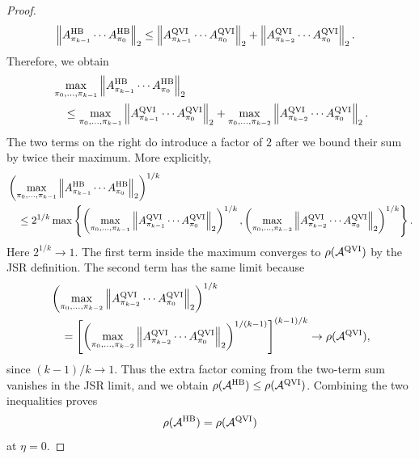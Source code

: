 \documentclass[letterpaper]{article}
\numberwithin{equation}{section}
\begin{document}
\begin{proof}
\begin{align*}
&\left\lVert
    A_{\pi_{k-1}}^{\rm HB}\cdots A_{\pi_0}^{\rm HB}
  \right\rVert_2 \le
  \left\lVert
    A_{\pi_{k-1}}^{\rm QVI}\cdots A_{\pi_0}^{\rm QVI}
  \right\rVert_2
  +
  \left\lVert
    A_{\pi_{k-2}}^{\rm QVI}\cdots A_{\pi_0}^{\rm QVI}
  \right\rVert_2.
\end{align*}
Therefore, we obtain
\begin{align*}
&\max_{\pi_0,\ldots,\pi_{k-1}}
  \left\|A_{\pi_{k-1}}^{\rm HB}\cdots A_{\pi_0}^{\rm HB}\right\|_2 \\
&\quad\le
  \max_{\pi_0,\ldots,\pi_{k-1}}
  \left\|A_{\pi_{k-1}}^{\rm QVI}\cdots A_{\pi_0}^{\rm QVI}\right\|_2
  +
  \max_{\pi_0,\ldots,\pi_{k-2}}
  \left\|A_{\pi_{k-2}}^{\rm QVI}\cdots A_{\pi_0}^{\rm QVI}\right\|_2.
\end{align*}
The two terms on the right do introduce a factor of $2$ after we bound their
sum by twice their maximum. More explicitly,
\begin{align*}
&\left(
  \max_{\pi_0,\ldots,\pi_{k-1}}
  \left\|A_{\pi_{k-1}}^{\rm HB}\cdots A_{\pi_0}^{\rm HB}\right\|_2
  \right)^{1/k} \\
&\quad\le 2^{1/k}\max\left\{
  \left(
  \max_{\pi_0,\ldots,\pi_{k-1}}
  \left\|A_{\pi_{k-1}}^{\rm QVI}\cdots A_{\pi_0}^{\rm QVI}\right\|_2
  \right)^{1/k},
  \left(
  \max_{\pi_0,\ldots,\pi_{k-2}}
  \left\|A_{\pi_{k-2}}^{\rm QVI}\cdots A_{\pi_0}^{\rm QVI}\right\|_2
  \right)^{1/k}
  \right\}.
\end{align*}
Here $2^{1/k}\to1$. The first term inside the maximum converges to
$\rho(\mathcal A^{\rm QVI})$ by the JSR definition. The second term has the same
limit because
\begin{align*}
&\left(
  \max_{\pi_0,\ldots,\pi_{k-2}}
  \left\|A_{\pi_{k-2}}^{\rm QVI}\cdots A_{\pi_0}^{\rm QVI}\right\|_2
  \right)^{1/k} \\
&\quad=
  \left[
  \left(
  \max_{\pi_0,\ldots,\pi_{k-2}}
  \left\|A_{\pi_{k-2}}^{\rm QVI}\cdots A_{\pi_0}^{\rm QVI}\right\|_2
  \right)^{1/(k-1)}
  \right]^{(k-1)/k}
  \to\rho(\mathcal A^{\rm QVI}),
\end{align*}
since $(k-1)/k\to1$. Thus the extra factor coming from the two-term sum
vanishes in the JSR limit, and we obtain
$\rho(\mathcal A^{\rm HB})\le\rho(\mathcal A^{\rm QVI})$. Combining the two inequalities proves
\begin{align*}
  \rho(\mathcal A^{\rm HB})
  =
  \rho(\mathcal A^{\rm QVI})
\end{align*}
at $\eta=0$.
\end{proof}
\end{document}
